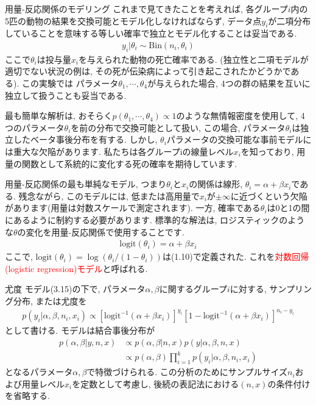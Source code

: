 \documentclass[10pt,dvipdfmx,a4]{beamer}
\newcommand{\eq}[1]{\begin{align}#1\end{align}}
\newcommand{\eqn}[1]{\begin{align*}#1\end{align*}}
\newcommand{\tcr}[1]{\textcolor{red}{#1}}
\begin{document}

\begin{frame}{用量-反応関係のモデリング}
これまで見てきたことを考えれば, 各グループ$i$内の5匹の動物の結果を交換可能とモデル化しなければならず, データ点$y_i$が二項分布していることを意味する等しい確率で独立とモデル化することは妥当である.
\eqn{y_i|\theta_i\sim\text{Bin}(n_i,\theta_i)}
ここで$\theta_i$は投与量$x_i$を与えられた動物の死亡確率である.
(独立性と二項モデルが適切でない状況の例は, その死が伝染病によって引き起こされたかどうかである).
この実験では パラメータ$\theta_1, \cdots, \theta_4$が与えられた場合, 4つの群の結果を互いに独立して扱うことも妥当である.

最も簡単な解析は, おそらく$p(\theta_1,\cdots,\theta_4)\propto1$のような無情報密度を使用して, 4つのパラメータ$\theta_i$を前の分布で交換可能として扱い, この場合, パラメータ$\theta_i$は独立したベータ事後分布を有する.
しかし, $\theta_i$パラメータの交換可能な事前モデルには重大な欠陥があります.
私たちは各グループiの線量レベル$x_i$を知っており, 用量の関数として系統的に変化する死の確率を期待しています.
\end{frame}


\begin{frame}
用量-反応関係の最も単純なモデル, つまり$\theta_i$と$x_i$の関係は線形, $\theta_i=\alpha+\beta x_i$である.
残念ながら, このモデルには, 低または高用量で$x_i$が$\pm \infty$に近づくという欠陥があります(用量は対数スケールで測定されます).
一方, 確率である$\theta_i$は0と1の間にあるように制約する必要があります.
標準的な解法は, ロジスティックのような$\theta$の変化を用量-反応関係で使用することです.
\eq{\text{logit}(\theta_i)=\alpha+\beta x_i}
ここで, $\text{logit}(\theta_i)=\log (\theta_i/(1-\theta_i))$は(1.10)で定義された.
これを\tcr{対数回帰(logistic regression)モデル}と呼ばれる.
\end{frame}


\begin{frame}{尤度}
モデル(3.15)の下で, パラメータ$\alpha, \beta$に関するグループ$i$に対する, サンプリング分布, または尤度を
\eq{p(y_i|\alpha,\beta,n_i,x_i)\propto[\text{logit}^{-1}(\alpha+\beta x_i)]^{y_i} [1-\text{logit}^{-1}(\alpha+\beta x_i)]^{n_i-y_i}}
として書ける.
モデルは結合事後分布が
\eq{p(\alpha,\beta|y,n,x)&\propto p(\alpha,\beta|n,x)p(y|\alpha,\beta,n,x)\\
&\propto p(\alpha,\beta)\prod_{i=1}^k p(y_i|\alpha,\beta,n_i,x_i)}
となるパラメータ$\alpha, \beta$で特徴づけられる.
この分析のためにサンプルサイズ$n_i$および用量レベル$x_i$を定数として考慮し, 後続の表記法における$(n,x)$の条件付けを省略する.
\end{frame}
\end{document}
